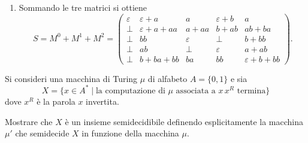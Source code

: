 \begin{sol}
\begin{enumerate}
\item Sommando le tre matrici si ottiene
\[
S=M^0+M^1+M^2=
\begin{pmatrix}
\varepsilon & \varepsilon+a & a & \varepsilon+b & a\\
\bot & \varepsilon+a+aa & a+aa & b+ab & ab+ba\\
\bot & bb & \varepsilon & \bot & b+bb\\
\bot & ab & \bot & \varepsilon & a+ab\\
\bot & b+ba+bb & ba & bb & \varepsilon+b+bb
\end{pmatrix}.
\]
\end{enumerate}
\end{sol}

\newpage

\begin{ex}
Si consideri una macchina di Turing $\mu$ di alfabeto $A=\{0,1\}$ e sia
\[
X=\{x\in A^*\mid \text{la computazione di }\mu\text{ associata a }x\,x^R\text{ termina}\}
\]
dove $x^R$ è la parola $x$ invertita.

Mostrare che $X$ è un insieme semidecidibile definendo esplicitamente la macchina $\mu'$
che semidecide $X$ in funzione della macchina $\mu$.
\end{ex}

